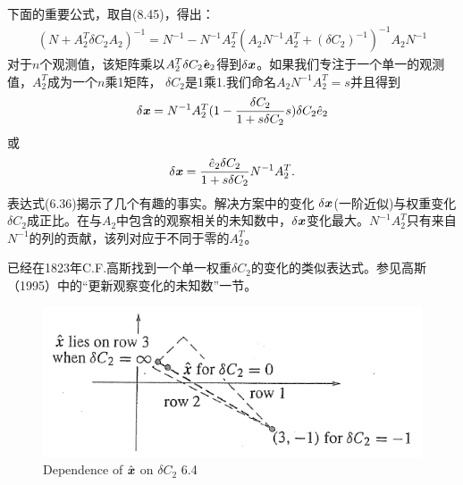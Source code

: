下面的重要公式，取自(8.45)，得出：
\begin{align}
( N + A^{T}_{2}\delta C_{2}A_{2})^{-1} = N^{-1} - N^{-1}A^{T}_{2}
(A_{2}N^{-1}A^{T}_{2} +(\delta C_{2})^{-1} )^{-1} A_{2} N^{-1}
\end{align}
对于$n$个观测值，该矩阵乘以$ A^{T}_{2}\delta C_{2} \hat{\textbf{\textit{e}}}_{2} $得到$ \delta \textbf{\textit{x}} $。如果我们专注于一个单一的观测值，$ A^{T}_{2} $成为一个$n$乘1矩阵， $ \delta C_{2} $是1乘1.我们命名$ A_{2}N^{-1}A^{T}_{2} = s $并且得到
\begin{align*}
\delta \textbf{\textit{x}} = N^{-1} A^{T}_{2} (1-\dfrac{\delta C_{2}}{1+s\delta C_{2}}s)\delta C_{2}\hat{e}_{2}
\end{align*}
或
\begin{align}
\delta \textbf{\textit{x}} = \dfrac{\hat{e}_{2}\delta C_{2} }{1+s\delta C_{2}}N^{-1}A^{T}_{2}.
\end{align}
表达式(6.36)揭示了几个有趣的事实。解决方案中的变化 $ \delta \textbf{\textit{x}} $(一阶近似)与权重变化$ \delta C_{2} $成正比。在与$A_{2}$中包含的观察相关的未知数中，$ \delta \textbf{\textit{x}} $变化最大。$ N^{-1}A^{T}_{2} $只有来自$N^{-1}$的列的贡献，该列对应于不同于零的$ A^{T}_{2} $。

已经在1823年C.F.高斯找到一个单一权重$ \delta C_{2} $的变化的类似表达式。参见高斯（1995）中的“更新观察变化的未知数”一节。

\begin{figure}[htb]
	\centering
	\includegraphics[width=0.7\linewidth]{TeX_files/Part02/chapter06/image/6-1}
	\caption{Dependence of $ \hat{\textbf{\textit{x}}}$ on $ \delta C_{2}$  6.4}
\end{figure}

